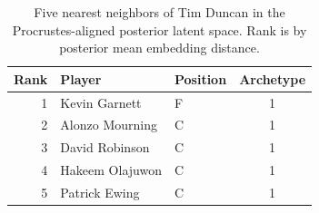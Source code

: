 \begin{table}[htbp]
  \centering\small
  \begin{tabular}{rllc}
    \toprule
    Rank & Player & Position & Archetype \\
    \midrule
    1 & Kevin Garnett & F & 1 \\
    2 & Alonzo Mourning & C & 1 \\
    3 & David Robinson & C & 1 \\
    4 & Hakeem Olajuwon & C & 1 \\
    5 & Patrick Ewing & C & 1 \\
    \bottomrule
  \end{tabular}
  \caption{Five nearest neighbors of Tim Duncan in the Procrustes-aligned posterior latent space. Rank is by posterior mean embedding distance.}
  \label{tab:Tim_Duncan_neighbors}
\end{table}

